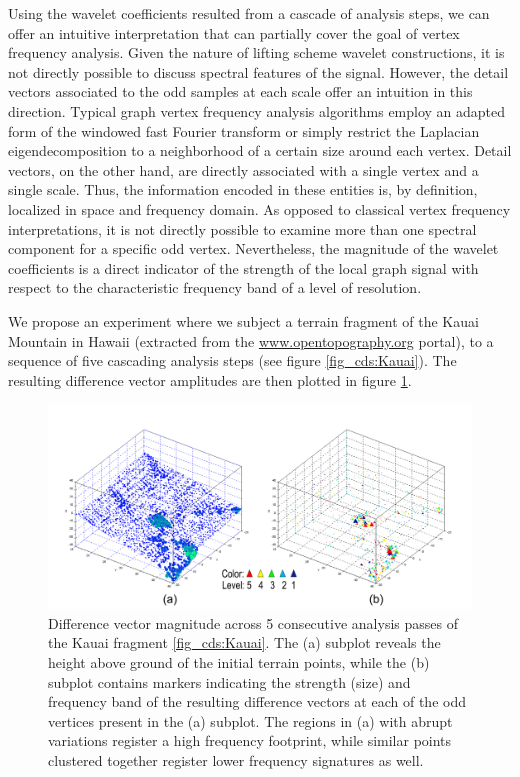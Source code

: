 \documentclass[graybox]{svmult}
\begin{document}
	Using the wavelet coefficients resulted from a cascade of analysis steps, we can offer an intuitive interpretation that can partially cover the goal of vertex frequency analysis.
	Given the nature of lifting scheme wavelet constructions, it is not directly possible to discuss spectral features of the signal. However, the detail vectors associated to the odd samples at each scale offer an intuition in this direction. 
	Typical graph vertex frequency analysis algorithms employ an adapted form of the windowed fast Fourier transform or simply restrict the Laplacian eigendecomposition to a neighborhood of a certain size around each vertex. Detail vectors, on the other hand, are directly associated with a single vertex and a single scale. Thus, the information encoded in these entities is, by definition, localized in space and frequency domain. As opposed to classical vertex frequency interpretations, it is not directly possible to examine more than one spectral component for a specific odd vertex. Nevertheless, the magnitude of the wavelet coefficients is a direct indicator of the strength of the local graph signal with respect to the characteristic frequency band of a level of resolution.
	
	We propose an experiment where we subject a terrain fragment of the Kauai Mountain in Hawaii  (extracted from the {\url{www.opentopography.org}} portal), to a sequence of five cascading analysis steps (see figure  \ref{fig_cds:Kauai}). The resulting difference vector amplitudes are then plotted in figure \ref{fig_cds:diff_vector_5}.
	
	\begin{figure}[!htbp]
		\centering
		\includegraphics[width=1\linewidth]{figs/KauaiVFA_plot.pdf}
		\caption{\label{fig_cds:diff_vector_5}
			Difference vector magnitude across 5 consecutive analysis passes of the Kauai fragment \ref{fig_cds:Kauai}. The (a) subplot reveals the height above ground of the initial terrain points, while the (b) subplot contains markers indicating the strength (size) and frequency band of the resulting difference vectors at each of the odd vertices present in the (a) subplot. The regions in (a) with abrupt variations register a high frequency footprint, while similar points clustered together register lower frequency signatures as well. }
	\end{figure}
	
\end{document}

